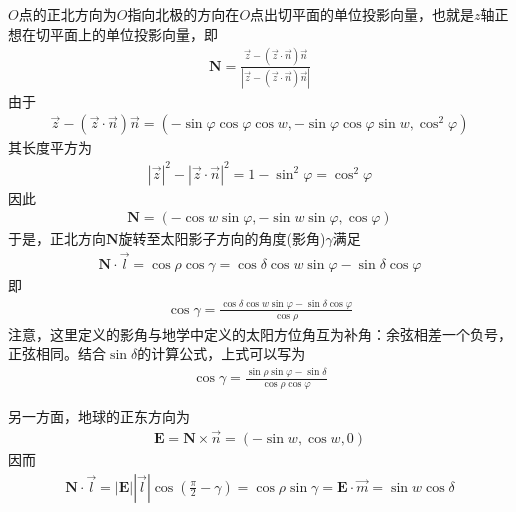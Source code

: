             $O$点的正北方向为$O$指向北极的方向在$O$点出切平面的单位投影向量，也就是$z$轴正想在切平面上的单位投影向量，即
            \begin{align*}
            \mathbf{N} = \frac{\vec{z} - (\vec{z}\cdot\vec{n})\vec{n}}{|\vec{z} - (\vec{z}\cdot\vec{n})\vec{n}|}
            \end{align*}
            由于
            \begin{align*}
            \vec{z} - (\vec{z}\cdot\vec{n})\vec{n} = (-\sin\varphi\cos\varphi\cos w,-\sin\varphi\cos\varphi\sin w,\cos^2\varphi)
            \end{align*}
            其长度平方为
            \begin{align*}
            |\vec{z}|^2 - |\vec{z}\cdot\vec{n}|^2 = 1-\sin^2\varphi = \cos^2\varphi
            \end{align*}
            因此
            \begin{align*}
            \mathbf{N} = (-\cos w\sin\varphi,-\sin w\sin\varphi,\cos\varphi)
            \end{align*}
            于是，正北方向$\mathbf{N}$旋转至太阳影子方向的角度(影角)$\gamma$满足
            \begin{align*}
            \mathbf{N}\cdot\vec{l} = \cos\rho\cos \gamma = \cos\delta\cos w\sin\varphi - \sin\delta\cos \varphi
            \end{align*}
            即
            \begin{align*}
            \cos \gamma = \frac{\cos\delta\cos w\sin\varphi - \sin\delta\cos \varphi}{\cos\rho}
            \end{align*}
            注意，这里定义的影角与地学中定义的太阳方位角互为补角：余弦相差一个负号，正弦相同。结合$\sin\delta$的计算公式，上式可以写为
            \begin{align*}
            \cos\gamma = \frac{\sin\rho\sin\varphi - \sin\delta}{\cos\rho\cos\varphi}
            \end{align*}
            \par
            另一方面，地球的正东方向为
            \begin{align*}
            \mathbf{E} = \mathbf{N}\times \vec{n}=(-\sin w,\cos w,0)
            \end{align*}
            因而
            \begin{align*}
            \mathbf{N}\cdot \vec{l} = |\mathbf{E}||\vec{l}|\cos (\frac{\pi}{2} - \gamma) = \cos\rho\sin \gamma = \mathbf{E}\cdot\vec{m} = \sin w\cos\delta
            \end{align*}
